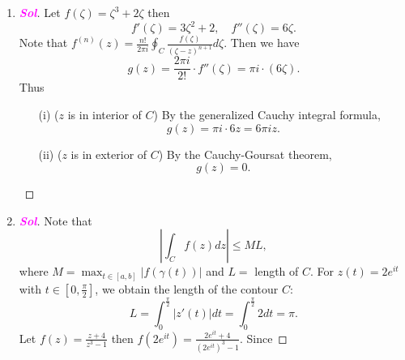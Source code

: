 \documentclass{article}
\newcommand{\ie}{\textnormal{i.e.}}
\theoremstyle{definition}
\newcommand{\of}[1]{\left( #1 \right)}
\newcommand{\abs}[1]{\left\lvert #1 \right\rvert}
\newcommand{\sol}{\textcolor{magenta}{\bf Sol}}
\begin{document}
\begin{enumerate}
\begin{proof}[\sol]
\begin{itemize}
\begin{align*}
				&=\frac{1}{i}\cdot 2\pi i\cdot e^0\quad\text{by the Cauchy integral formula}\\
				&=2\pi.
				\end{align*}\[
				\]
				\item[(b)] Let $z = e^{i\theta}$ and $dz = ie^{i\theta} d\theta$ (\ie, $d\theta=\frac{1}{ie^{i\theta}}dz$). Then, the integral becomes: \begin{align*}
				\int_0^{2\pi}e^{-i\theta}e^{e^{i\theta}}d\theta&=\oint_{\abs{z}=1}z^{-1}\cdot e^z\cdot\frac{1}{iz}dz\\
				&=\frac{1}{i}\oint_{\abs{z}=1}\frac{e^z}{z^2}dz\\
				&=\frac{1}{i}\oint_{\abs{z}=1}\frac{e^z}{\of{z-0}^2}dz\\
				&=\frac{1}{i}\cdot 2\pi i\cdot e^0\quad\because f^{\of{1}}\of{a}=\frac{1!}{2\pi i}\oint_C\frac{f\of{z}}{\of{z-a}^{1+1}}dz\\
				&=2\pi.
				\end{align*}
			\end{itemize}
		\end{proof}
		\item 
		\begin{proof}[\sol]
			Let $f\of{\zeta}=\zeta^3+2\zeta$ then \[
			f'\of{\zeta}=3\zeta^2+2,\quad f''\of{\zeta}=6\zeta.
			\] Note that $\displaystyle f^{\of{n}}\of{z}=\frac{n!}{2\pi i}\oint_C\frac{f\of{\zeta}}{\of{\zeta-z}^{n+1}}d\zeta$. Then we have \[
			g\of{z}=\frac{2\pi i}{2!}\cdot f''\of{\zeta}=\pi i\cdot\of{6\zeta}.
			\] Thus \begin{itemize}
				\item[(i)] ($z$ is in interior of $C$) By the generalized Cauchy integral formula, \[
				g\of{z}=\pi i\cdot 6z = 6\pi iz.
				\]
				\item[(ii)] ($z$ is in exterior of $C$) By the Cauchy-Goursat theorem, \[
				g\of{z} = 0.
				\]
			\end{itemize}
		\end{proof}
		\item 
		\begin{proof}[\sol]
			Note that
			\[
			\left|\int_C f(z) dz\right| \leq ML,
			\] where $M=\max_{t\in[a,b]}\abs{f\of{\gamma\of{t}}}$ and $L = $ length of $C$.
			For $z(t) = 2e^{it}$ with $t \in [0, \frac{\pi}{2}]$, we obtain the length of the contour $C$:
			\[
			L = \int_0^{\frac{\pi}{2}} |z'(t)| dt = \int_0^{\frac{\pi}{2}} 2 dt = \pi.
			\]
			Let $\displaystyle
			f(z) = \frac{z + 4}{z^3 - 1}$ then $\displaystyle
			f(2e^{it}) = \frac{2e^{it} + 4}{(2e^{it})^3 - 1}$.
			Since
			

\end{proof}
\end{enumerate}
\end{document}
